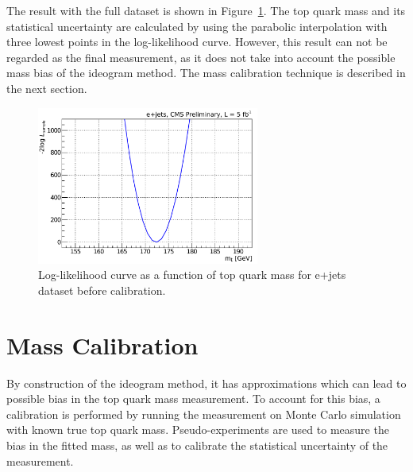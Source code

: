 The result with the full dataset is shown in Figure~\ref{fig:LogLikelihood}. The top quark mass and its statistical
uncertainty are calculated by using the parabolic interpolation with three lowest points in the log-likelihood curve.
However, this result can not be regarded as the final measurement, as it does not take into account the possible mass
bias of the ideogram method. The mass calibration technique is described in the next section.

\begin{figure}[!htpb]
\begin{center}
	\includegraphics[width=0.65\textwidth]{Likelihood}
	\caption{\label{fig:LogLikelihood}
	Log-likelihood curve as a function of top quark mass for e+jets dataset before calibration.}
\end{center}
\end{figure}

\section{Mass Calibration}
\label{s_top_mass:calibration}

By construction of the ideogram method, it has approximations which can lead to possible bias in the top quark mass
measurement. To account for this bias, a calibration is performed by running the measurement on Monte Carlo simulation
with known true top quark mass. Pseudo-experiments are used to measure the bias in the fitted mass, as well as to
calibrate the statistical uncertainty of the measurement.

